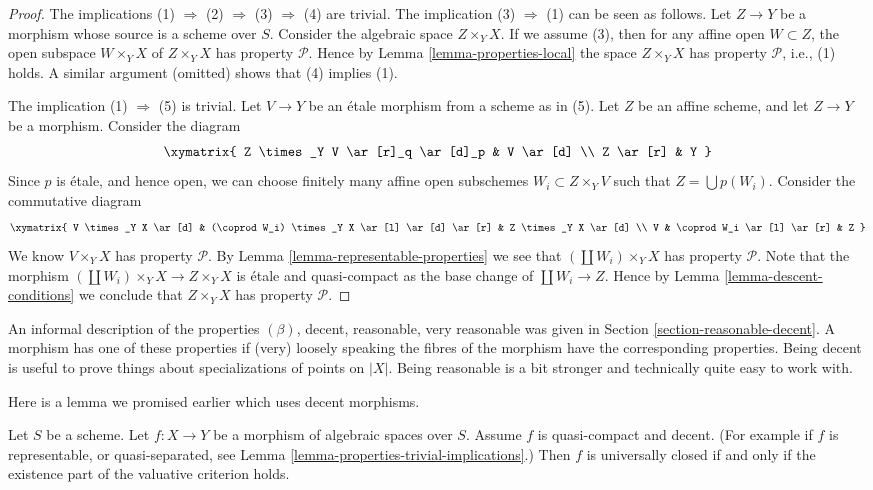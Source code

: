 \begin{proof}
The implications (1) $\Rightarrow$ (2) $\Rightarrow$ (3) $\Rightarrow$ (4)
are trivial.
The implication (3) $\Rightarrow$ (1) can be seen as follows.
Let $Z \to Y$ be a morphism whose source is a scheme over $S$.
Consider the algebraic space $Z \times_Y X$. If we assume (3), then
for any affine open $W \subset Z$, the open subspace
$W \times_Y X$ of $Z \times_Y X$ has property $\mathcal{P}$. Hence by
Lemma \ref{lemma-properties-local}
the space $Z \times_Y X$ has property $\mathcal{P}$, i.e., (1) holds.
A similar argument (omitted) shows that (4) implies (1).

\medskip\noindent
The implication (1) $\Rightarrow$ (5) is trivial. Let $V \to Y$ be
an \'etale morphism from a scheme as in (5). Let $Z$ be an affine scheme,
and let $Z \to Y$ be a morphism. Consider the diagram
$$
\xymatrix{
Z \times_Y V \ar[r]_q \ar[d]_p & V \ar[d] \\
Z \ar[r] & Y
}
$$
Since $p$ is \'etale, and hence open, we can choose finitely many affine open
subschemes $W_i \subset Z \times_Y V$ such that $Z = \bigcup p(W_i)$.
Consider the commutative diagram
$$
\xymatrix{
V \times_Y X \ar[d] &
(\coprod W_i) \times_Y X \ar[l] \ar[d] \ar[r] &
Z \times_Y X \ar[d] \\
V &
\coprod W_i \ar[l] \ar[r] &
Z
}
$$
We know $V \times_Y X$ has property $\mathcal{P}$. By
Lemma \ref{lemma-representable-properties}
we see that $(\coprod W_i) \times_Y X$ has property $\mathcal{P}$.
Note that the morphism $(\coprod W_i) \times_Y X \to Z \times_Y X$
is \'etale and quasi-compact as the base change of $\coprod W_i \to Z$.
Hence by Lemma \ref{lemma-descent-conditions}
we conclude that $Z \times_Y X$ has property $\mathcal{P}$.
\end{proof}

\begin{remark}
\label{remark-very-reasonable}
An informal description of the properties $(\beta)$, decent, reasonable,
very reasonable was given in Section \ref{section-reasonable-decent}.
A morphism has one of these properties if (very) loosely speaking the
fibres of the morphism have the corresponding properties.
Being decent is useful to prove things about specializations of
points on $|X|$. Being reasonable is a bit stronger and technically
quite easy to work with.
\end{remark}

\noindent
Here is a lemma we promised earlier which uses decent morphisms.

\begin{lemma}
\label{lemma-re-characterize-universally-closed}
Let $S$ be a scheme.
Let $f : X \to Y$ be a morphism of algebraic spaces over $S$.
Assume $f$ is quasi-compact and decent.
(For example if $f$ is representable, or quasi-separated, see
Lemma \ref{lemma-properties-trivial-implications}.)
Then $f$ is universally closed if and only if the
existence part of the valuative criterion holds.
\end{lemma}

